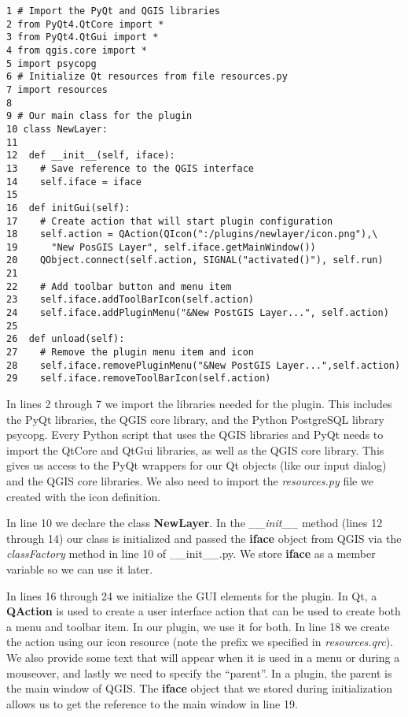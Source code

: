 \begin{verbatim}
1 # Import the PyQt and QGIS libraries
2 from PyQt4.QtCore import *
3 from PyQt4.QtGui import *
4 from qgis.core import *
5 import psycopg
6 # Initialize Qt resources from file resources.py
7 import resources
8
9 # Our main class for the plugin
10 class NewLayer:
11
12  def __init__(self, iface):
13    # Save reference to the QGIS interface
14    self.iface = iface
15
16  def initGui(self):
17    # Create action that will start plugin configuration
18    self.action = QAction(QIcon(":/plugins/newlayer/icon.png"),\
19      "New PosGIS Layer", self.iface.getMainWindow())
20    QObject.connect(self.action, SIGNAL("activated()"), self.run)
21
22    # Add toolbar button and menu item
23    self.iface.addToolBarIcon(self.action)
24    self.iface.addPluginMenu("&New PostGIS Layer...", self.action)
25
26  def unload(self):
27    # Remove the plugin menu item and icon
28    self.iface.removePluginMenu("&New PostGIS Layer...",self.action)
29    self.iface.removeToolBarIcon(self.action)
\end{verbatim}

In lines 2 through 7 we import the libraries needed for the plugin. 
This includes the PyQt libraries, the QGIS core library, and the Python 
PostgreSQL library psycopg. Every Python script that uses the QGIS 
libraries and PyQt needs to import the QtCore and QtGui libraries, as 
well as the QGIS core library.
This gives us access to the PyQt wrappers for our Qt objects (like our
input dialog) and the QGIS core libraries.  We also need to import the
\textsl{resources.py} file we created with the icon definition.

In line 10 we declare the class \textbf{NewLayer}. In the \textsl{\_\_init\_\_} 
method (lines 12 through 14) our class is initialized and passed the 
\textbf{iface} object from QGIS via the \textsl{classFactory} method
in line 10 of \_\_init\_\_.py. We store \textbf{iface} as a 
member variable so we can use it later. 

In lines 16 through 24 we initialize the GUI
elements for the plugin. In Qt, a \textbf{QAction} is used to create a
user interface action that can be used to create both a menu and toolbar
item. In our plugin, we use it for both. In line 18 we create the
action using our icon resource (note the prefix we specified in
\textsl{resources.qrc}). We also provide some text that will appear when
it is used in a menu or during a mouseover, and lastly we need to specify
the ``parent''. In a plugin, the parent is the main window of QGIS. The
\textbf{iface} object that we stored during initialization allows us to
get the reference to the main window in line 19.

